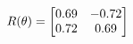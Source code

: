 \documentclass[preview]{standalone}
\begin{document}
\begin{align*}
\special{dvisvgm:raw <g id='unique000'>}R(\theta) = \begin{bmatrix}0.69 & -0.72\\0.72 & 0.69\end{bmatrix}\special{dvisvgm:raw </g>}
\end{align*}
\end{document}
